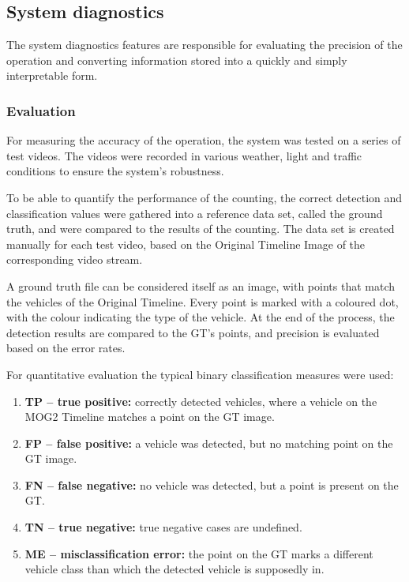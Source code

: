 \subsection{System diagnostics}
The system diagnostics features are responsible for evaluating the precision of the operation and converting information stored into a quickly and simply interpretable form.

\subsubsection{Evaluation}
For measuring the accuracy of the operation, the system was tested on a series of test videos.
The videos were recorded in various weather, light and traffic conditions to ensure the system's robustness.

To be able to quantify the performance of the counting, the correct detection and classification values were gathered into a reference data set, called the ground truth, and were compared to the results of the counting.
The data set is created manually for each test video, based on the Original Timeline Image of the corresponding video stream.

A ground truth file can be considered itself as an image, with points that match the vehicles of the Original Timeline.
Every point is marked with a coloured dot, with the colour indicating the type of the vehicle.
At the end of the process, the detection results are compared to the GT's  points, and precision is evaluated based on the error rates.

For quantitative evaluation the typical binary classification measures were used:
\begin{enumerate}
\item \textbf{TP -- true positive:} correctly detected vehicles, where a vehicle on the MOG2 Timeline matches a point on the GT image.
\item \textbf{FP -- false positive:} a vehicle was detected, but no matching point on the GT image.
\item \textbf{FN -- false negative:} no vehicle was detected, but a point is present on the GT. 
\item \textbf{TN -- true negative:} true negative cases are undefined.
\item  \textbf{ME -- misclassification error:} the point on the GT marks a different vehicle class than which the detected vehicle is supposedly in.
\end{enumerate}

